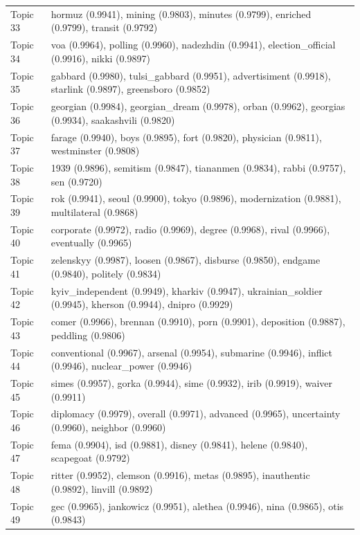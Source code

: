 \begin{table}
\begin{tabular}{lp{12cm}}
Topic 33 & hormuz (0.9941), mining (0.9803), minutes (0.9799), enriched (0.9799), transit (0.9792) \\
Topic 34 & voa (0.9964), polling (0.9960), nadezhdin (0.9941), election\_official (0.9916), nikki (0.9897) \\
Topic 35 & gabbard (0.9980), tulsi\_gabbard (0.9951), advertisiment (0.9918), starlink (0.9897), greensboro (0.9852) \\
Topic 36 & georgian (0.9984), georgian\_dream (0.9978), orban (0.9962), georgias (0.9934), saakashvili (0.9820) \\
Topic 37 & farage (0.9940), boys (0.9895), fort (0.9820), physician (0.9811), westminster (0.9808) \\
Topic 38 & 1939 (0.9896), semitism (0.9847), tiananmen (0.9834), rabbi (0.9757), sen (0.9720) \\
Topic 39 & rok (0.9941), seoul (0.9900), tokyo (0.9896), modernization (0.9881), multilateral (0.9868) \\
Topic 40 & corporate (0.9972), radio (0.9969), degree (0.9968), rival (0.9966), eventually (0.9965) \\
Topic 41 & zelenskyy (0.9987), loosen (0.9867), disburse (0.9850), endgame (0.9840), politely (0.9834) \\
Topic 42 & kyiv\_independent (0.9949), kharkiv (0.9947), ukrainian\_soldier (0.9945), kherson (0.9944), dnipro (0.9929) \\
Topic 43 & comer (0.9966), brennan (0.9910), porn (0.9901), deposition (0.9887), peddling (0.9806) \\
Topic 44 & conventional (0.9967), arsenal (0.9954), submarine (0.9946), inflict (0.9946), nuclear\_power (0.9946) \\
Topic 45 & simes (0.9957), gorka (0.9944), sime (0.9932), irib (0.9919), waiver (0.9911) \\
Topic 46 & diplomacy (0.9979), overall (0.9971), advanced (0.9965), uncertainty (0.9960), neighbor (0.9960) \\
Topic 47 & fema (0.9904), isd (0.9881), disney (0.9841), helene (0.9840), scapegoat (0.9792) \\
Topic 48 & ritter (0.9952), clemson (0.9916), metas (0.9895), inauthentic (0.9892), linvill (0.9892) \\
Topic 49 & gec (0.9965), jankowicz (0.9951), alethea (0.9946), nina (0.9865), otis (0.9843) \\
\bottomrule
\end{tabular}
\end{table}
